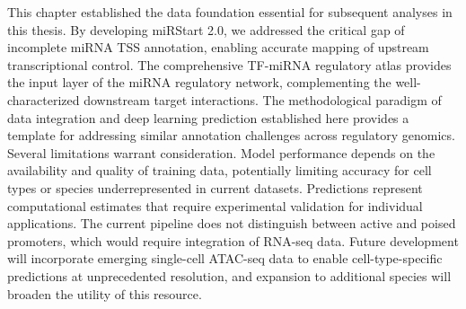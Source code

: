 This chapter established the data foundation essential for subsequent analyses in this thesis. By developing miRStart 2.0, we addressed the critical gap of incomplete miRNA TSS annotation, enabling accurate mapping of upstream transcriptional control. The comprehensive TF-miRNA regulatory atlas provides the input layer of the miRNA regulatory network, complementing the well-characterized downstream target interactions. The methodological paradigm of data integration and deep learning prediction established here provides a template for addressing similar annotation challenges across regulatory genomics. Several limitations warrant consideration. Model performance depends on the availability and quality of training data, potentially limiting accuracy for cell types or species underrepresented in current datasets. Predictions represent computational estimates that require experimental validation for individual applications. The current pipeline does not distinguish between active and poised promoters, which would require integration of RNA-seq data. Future development will incorporate emerging single-cell ATAC-seq data to enable cell-type-specific predictions at unprecedented resolution, and expansion to additional species will broaden the utility of this resource.
